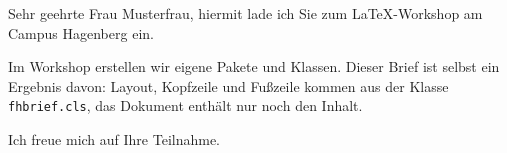 \documentclass[11pt]{fhbrief}
\begin{document}
\begin{brief}{Sehr geehrte Frau Musterfrau,}
  hiermit lade ich Sie zum \LaTeX-Workshop am Campus Hagenberg ein.

  Im Workshop erstellen wir eigene Pakete und Klassen. Dieser Brief ist
  selbst ein Ergebnis davon: Layout, Kopfzeile und Fußzeile kommen aus
  der Klasse \texttt{fhbrief.cls}, das Dokument enthält nur noch den Inhalt.

  Ich freue mich auf Ihre Teilnahme.
\end{brief}
\end{document}
